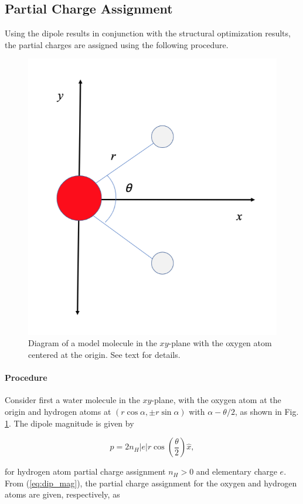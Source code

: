             \subsection{Partial Charge Assignment}
            
            Using the dipole results in conjunction with the structural optimization results, the partial charges are assigned using the following procedure.
            
            \begin{figure}
                \centering
                \includegraphics[width=0.5\linewidth]{Figures/System/pc_analysis.png}
                \caption{Diagram of a model molecule in the $xy$-plane with the oxygen atom centered at the origin. See text for details.}
                \label{fig:pc_analysis}
            \end{figure}
            
            \paragraph{Procedure} Consider first a water molecule in the $xy$-plane, with the oxygen atom at the origin and hydrogen atoms at $(r\cos\alpha,\pm r\sin\alpha)$ with $\alpha - \theta/2$, as shown in Fig. \ref{fig:pc_analysis}. The dipole magnitude is given by
            
            \begin{equation}
            \label{eq:dip_mag}
                p = 2n_H|e| r \cos\left(\frac{\theta}{2} \right)\hat{x},
            \end{equation}

        \noindent for hydrogen atom partial charge assignment $n_H > 0$ and elementary charge $e$. From (\ref{eq:dip_mag}), the partial charge assignment for the oxygen and hydrogen atoms are given, respectively, as
        

